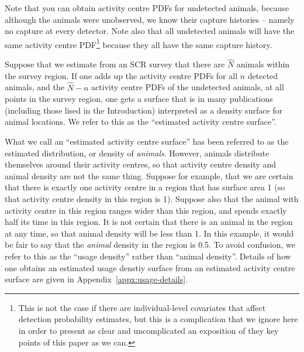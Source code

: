 \documentclass[10pt,a4paper]{article}
\begin{document}
Note that you can obtain activity centre PDFs for undetected animals, because although the animals were unobserved, we know their capture histories -- namely no capture at every detector. Note also that all undetected animals will have the same activity centre PDF\footnote{This is not the case if there are individual-level covariates that affect detection probability estimates, but this is a complication that we ignore here in order to present as clear and uncomplicated an exposition of they key points of this paper as we can.} because they all have the same capture history. 

Suppose that we estimate from an SCR survey that there are $\hat{N}$ animals within the survey region. If one adds up the activity centre PDFs for all $n$ detected animals, and the $\hat{N}-n$ activity centre PDFs of the undetected animals, at all points in the survey region, one gets a surface that is in many publications (including those lised in the Introduction) interpreted as a density surface for animal locations.  We refer to this as the ``estimated activity centre surface''.

What we call an ``estimated activity centre surface'' has been referred to as the estimated distribution, or density of \textit{animals}. However, animals distribute themselves around their activity centres, so that activity centre density and animal density are not the same thing. Suppose for example, that we are certain that there is exactly one activity centre in a region that has surface area 1 (so that activity centre density in this region is 1). Suppose also that the animal with activity centre in this region ranges wider than this region, and spends exactly half its time in this region. It is not certain that there is an animal in the region at any time, so that animal density will be less than 1. In this example, it would be fair to say that the \textit{animal} density in the region is 0.5. To avoid confusion, we refer to this as the ``usage density'' rather than ``animal density''. Details of how one obtains an estimated usage denstiy surface from an estimated activity centre surface are given in Appendix~\ref{appx:usage-details}.
\end{document}
